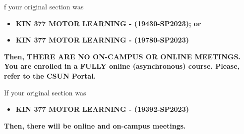 \documentclass[
  letterpaper,
  DIV=11,
  numbers=noendperiod]{scrartcl}
\providecommand{\tightlist}{%
  \setlength{\itemsep}{0pt}\setlength{\parskip}{0pt}}\usepackage{longtable,booktabs,array}
\begin{document}
\begin{tcolorbox}[enhanced jigsaw, leftrule=.75mm, breakable, opacityback=0, bottomrule=.15mm, rightrule=.15mm, colbacktitle=quarto-callout-warning-color!10!white, colframe=quarto-callout-warning-color-frame, arc=.35mm, bottomtitle=1mm, left=2mm, title=\textcolor{quarto-callout-warning-color}{\faExclamationTriangle}\hspace{0.5em}{Warning}, titlerule=0mm, toptitle=1mm, toprule=.15mm, opacitybacktitle=0.6, colback=white, coltitle=black]

f your original section was~

\begin{itemize}
\item
  \textbf{KIN 377 MOTOR LEARNING - (19430-SP2023); or}
\item
  \textbf{KIN 377 MOTOR LEARNING - (19780-SP2023)}
\end{itemize}

\textbf{Then, THERE ARE NO ON-CAMPUS OR ONLINE MEETINGS. You are
enrolled in a FULLY online (asynchronous) course. Please, refer to the
CSUN Portal.}

If your original section was~

\begin{itemize}
\tightlist
\item
  \textbf{KIN 377 MOTOR LEARNING - (19392-SP2023)}
\end{itemize}

\textbf{Then, there will be online and on-campus meetings.}

\end{tcolorbox}
\end{document}
